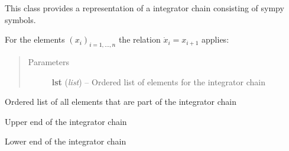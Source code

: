 \documentclass[letterpaper,10pt,english]{sphinxmanual}
\begin{document}
\begin{fulllineitems}
\label{pytrajectory:pytrajectory.utilities.IntegChain}
This class provides a representation of a integrator chain consisting of sympy symbols.

For the elements \((x_i)_{i=1,...,n}\) the relation
\(\dot{x}_i = x_{i+1}\) applies:
\begin{quote}\begin{description}
\item[{Parameters}] \leavevmode
\textbf{lst} (\emph{list}) -- Ordered list of elements for the integrator chain

\end{description}\end{quote}

\begin{fulllineitems}
\label{pytrajectory:pytrajectory.utilities.IntegChain.elements}
Ordered list of all elements that are part of the integrator chain

\end{fulllineitems}


\begin{fulllineitems}
\label{pytrajectory:pytrajectory.utilities.IntegChain.upper}
Upper end of the integrator chain

\end{fulllineitems}


\begin{fulllineitems}
\label{pytrajectory:pytrajectory.utilities.IntegChain.lower}
Lower end of the integrator chain

\end{fulllineitems}


\end{fulllineitems}

\end{document}
